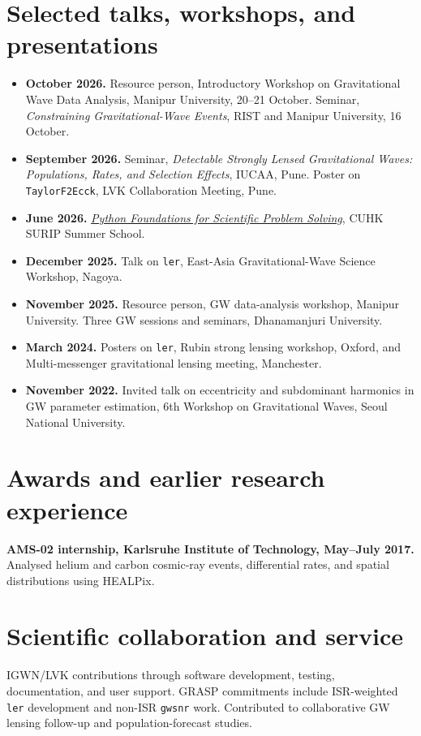 \documentclass[11pt]{article}
\begin{document}
\section*{Selected talks, workshops, and presentations}
\begin{itemize}
\item \textbf{October 2026.} Resource person, Introductory Workshop on Gravitational Wave Data Analysis, Manipur University, 20--21 October. Seminar, \textit{Constraining Gravitational-Wave Events}, RIST and Manipur University, 16 October.
\item \textbf{September 2026.} Seminar, \textit{Detectable Strongly Lensed Gravitational Waves: Populations, Rates, and Selection Effects}, IUCAA, Pune. Poster on \texttt{TaylorF2Ecck}, LVK Collaboration Meeting, Pune.
\item \textbf{June 2026.} \href{https://gw.phy.cuhk.edu.hk/activities/surip-summer-school-2026/}{\textit{Python Foundations for Scientific Problem Solving}}, CUHK SURIP Summer School.
\item \textbf{December 2025.} Talk on \texttt{ler}, East-Asia Gravitational-Wave Science Workshop, Nagoya.
\item \textbf{November 2025.} Resource person, GW data-analysis workshop, Manipur University. Three GW sessions and seminars, Dhanamanjuri University.
\item \textbf{March 2024.} Posters on \texttt{ler}, Rubin strong lensing workshop, Oxford, and Multi-messenger gravitational lensing meeting, Manchester.
\item \textbf{November 2022.} Invited talk on eccentricity and subdominant harmonics in GW parameter estimation, 6th Workshop on Gravitational Waves, Seoul National University.
\end{itemize}

\section*{Awards and earlier research experience}
\textbf{AMS-02 internship, Karlsruhe Institute of Technology, May--July 2017.} Analysed helium and carbon cosmic-ray events, differential rates, and spatial distributions using HEALPix.

\section*{Scientific collaboration and service}
IGWN/LVK contributions through software development, testing, documentation, and user support. GRASP commitments include ISR-weighted \texttt{ler} development and non-ISR \texttt{gwsnr} work. Contributed to collaborative GW lensing follow-up and population-forecast studies.
\end{document}
